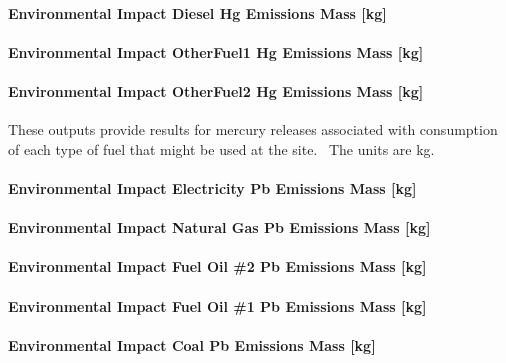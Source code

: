 \paragraph{Environmental Impact Diesel Hg Emissions Mass {[}kg{]}}\label{environmental-impact-diesel-hg-emissions-mass-kg}

\paragraph{Environmental Impact OtherFuel1 Hg Emissions Mass {[}kg{]}}\label{environmental-impact-otherfuel1-hg-emissions-mass-kg}

\paragraph{Environmental Impact OtherFuel2 Hg Emissions Mass {[}kg{]}}\label{environmental-impact-otherfuel2-hg-emissions-mass-kg}

These outputs provide results for mercury releases associated with consumption of each type of fuel that might be used at the site.~ The units are kg.

\paragraph{Environmental Impact Electricity Pb Emissions Mass {[}kg{]}}\label{environmental-impact-electricity-pb-emissions-mass-kg}

\paragraph{Environmental Impact Natural Gas Pb Emissions Mass {[}kg{]}}\label{environmental-impact-natural-gas-pb-emissions-mass-kg}

\paragraph{Environmental Impact Fuel Oil \#2 Pb Emissions Mass {[}kg{]}}\label{environmental-impact-fuel-oil-2-pb-emissions-mass-kg}

\paragraph{Environmental Impact Fuel Oil \#1 Pb Emissions Mass {[}kg{]}}\label{environmental-impact-fuel-oil-1-pb-emissions-mass-kg}

\paragraph{Environmental Impact Coal Pb Emissions Mass {[}kg{]}}\label{environmental-impact-coal-pb-emissions-mass-kg}

